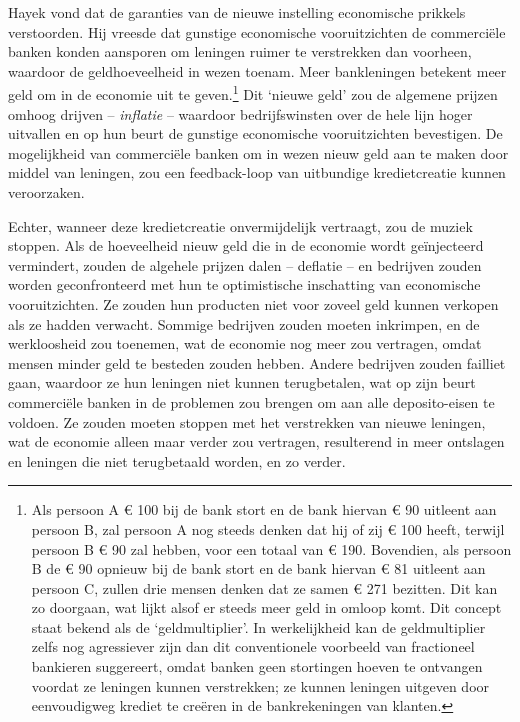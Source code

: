\documentclass[
  a5paper,
  smalldemyvopaper,11pt,twoside,onecolumn,openright,extrafontsizes]{memoir}
\begin{document}
Hayek vond dat de garanties van de nieuwe instelling economische
prikkels verstoorden. Hij vreesde dat gunstige economische
vooruitzichten de commerciële banken konden aansporen om leningen ruimer
te verstrekken dan voorheen, waardoor de geldhoeveelheid in wezen
toenam. Meer bankleningen betekent meer geld om in de economie uit te
geven.\footnote{Als persoon A € 100 bij de bank stort en de bank hiervan
  € 90 uitleent aan persoon B, zal persoon A nog steeds denken dat hij
  of zij € 100 heeft, terwijl persoon B € 90 zal hebben, voor een totaal
  van € 190. Bovendien, als persoon B de € 90 opnieuw bij de bank stort
  en de bank hiervan € 81 uitleent aan persoon C, zullen drie mensen
  denken dat ze samen € 271 bezitten. Dit kan zo doorgaan, wat lijkt
  alsof er steeds meer geld in omloop komt. Dit concept staat bekend als
  de `geldmultiplier'. In werkelijkheid kan de geldmultiplier zelfs nog
  agressiever zijn dan dit conventionele voorbeeld van fractioneel
  bankieren suggereert, omdat banken geen stortingen hoeven te ontvangen
  voordat ze leningen kunnen verstrekken; ze kunnen leningen uitgeven
  door eenvoudigweg krediet te creëren in de bankrekeningen van klanten.}
Dit `nieuwe geld' zou de algemene prijzen omhoog drijven --
\emph{inflatie} -- waardoor bedrijfswinsten over de hele lijn hoger
uitvallen en op hun beurt de gunstige economische vooruitzichten
bevestigen. De mogelijkheid van commerciële banken om in wezen nieuw
geld aan te maken door middel van leningen, zou een feedback-loop van
uitbundige kredietcreatie kunnen veroorzaken.

Echter, wanneer deze kredietcreatie onvermijdelijk vertraagt, zou de
muziek stoppen. Als de hoeveelheid nieuw geld die in de economie wordt
geïnjecteerd vermindert, zouden de algehele prijzen dalen -- deflatie --
en bedrijven zouden worden geconfronteerd met hun te optimistische
inschatting van economische vooruitzichten. Ze zouden hun producten niet
voor zoveel geld kunnen verkopen als ze hadden verwacht. Sommige
bedrijven zouden moeten inkrimpen, en de werkloosheid zou toenemen, wat
de economie nog meer zou vertragen, omdat mensen minder geld te besteden
zouden hebben. Andere bedrijven zouden failliet gaan, waardoor ze hun
leningen niet kunnen terugbetalen, wat op zijn beurt commerciële banken
in de problemen zou brengen om aan alle deposito-eisen te voldoen. Ze
zouden moeten stoppen met het verstrekken van nieuwe leningen, wat de
economie alleen maar verder zou vertragen, resulterend in meer ontslagen
en leningen die niet terugbetaald worden, en zo verder.
\end{document}
